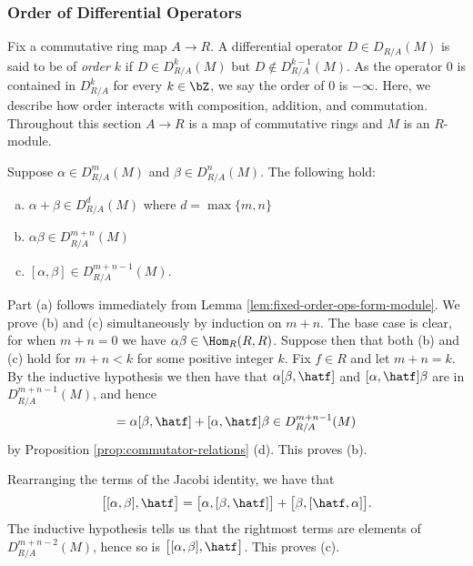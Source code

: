 \subsubsection{Order of Differential Operators}
Fix a commutative ring map $A\to R$. A differential operator $D \in D_{R/A}(M)$ is said to be of \emph{order $k$} if $D \in D^k_{R/A}(M)$ but $D \not\in D^{k-1}_{R/A}(M)$. As the operator $0$ is contained in $D^k_{R/A}$ for every $k \in \bZ$, we say the order of $0$ is $-\infty$. Here, we describe how order interacts with composition, addition, and commutation. Throughout this section $A\to R$ is a map of commutative rings and $M$ is an $R$-module.

\begin{prop}\label{prop:order-interactions}
	 Suppose $\alpha \in D^{m}_{R/A}(M)$ and $\beta \in D^{n}_{R/A}(M)$. The following hold:
	 \begin{enumerate}[(a)]
		 \item $\alpha+\beta \in D^d_{R/A}(M)$ where $d = \max\{m,n\}$
		 \item $\alpha\beta \in D^{m+n}_{R/A}(M)$
		 \item $[\alpha,\beta] \in D^{m+n -1}_{R/A}(M)$.
	 \end{enumerate}
\end{prop}
\begin{prf}
	Part (a) follows immediately from Lemma \ref{lem:fixed-order-ops-form-module}. We prove (b) and (c) simultaneously by induction on $m + n$. The base case is clear, for when $m + n = 0$ we have $\alpha\beta \in \Hom_R(R,R)$. Suppose then that both (b) and (c) hold for $m + n < k$ for some positive integer $k$. Fix $f \in R$ and let $m+n = k$. By the inductive hypothesis we then have that $\alpha[\beta,\hatf]$ and $[\alpha,\hatf]\beta$ are in $D^{m+n-1}_{R/A}(M)$, and hence
	\begin{align*}
		[\alpha\beta,\hatf] = \alpha[\beta,\hatf] + [\alpha, \hatf]\beta \in D^{m+n-1}_{R/A}(M)
	\end{align*}
	by Proposition \ref{prop:commutator-relations} (d). This proves (b).

	Rearranging the terms of the Jacobi identity, we have that
	\begin{align*}
		\big[[\alpha,\beta], \hatf\big] = \big[\alpha, [\beta,\hatf]\big] + \big[\beta,[\hatf,\alpha]\big].
	\end{align*}
	The inductive hypothesis tells us that the rightmost terms are elements of $D^{m+n-2}_{R/A}(M)$, hence so is $\big[[\alpha,\beta], \hatf\big]$. This proves (c).
\end{prf}

